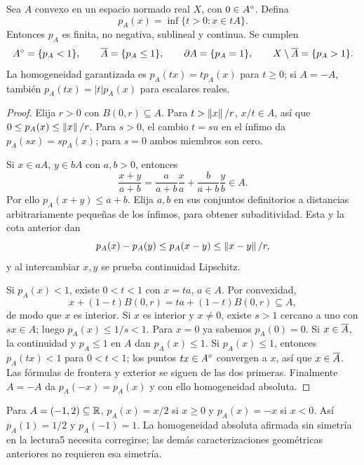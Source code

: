 \begin{teorema}\label{v3:minkowski}
Sea $A$ convexo en un espacio normado real $X$, con $0\in A^{\circ}$. Defina
\[
 p_A(x)=\inf\{t>0:x\in tA\}.
\]
Entonces $p_A$ es finita, no negativa, sublineal y continua. Se cumplen
\[
 A^{\circ}=\{p_A<1\},\qquad \overline{A}=\{p_A\leq1\},\qquad
 \partial A=\{p_A=1\},\qquad X\setminus\overline{A}=\{p_A>1\}.
\]
La homogeneidad garantizada es $p_A(tx)=tp_A(x)$ para $t\geq0$; si $A=-A$, también $p_A(tx)=|t|p_A(x)$ para escalares reales.
\end{teorema}
\begin{proof}
Elija $r>0$ con $B(0,r)\subseteq A$. Para $t>\left\lVert x\right\rVert/r$, $x/t\in A$, así que $0\leq p_A(x)\leq\left\lVert x\right\rVert/r$. Para $s>0$, el cambio $t=su$ en el ínfimo da $p_A(sx)=sp_A(x)$; para $s=0$ ambos miembros son cero.

Si $x\in aA$, $y\in bA$ con $a,b>0$, entonces
\[
 \frac{x+y}{a+b}=\frac a{a+b}\frac xa+\frac b{a+b}\frac yb\in A.
\]
Por ello $p_A(x+y)\leq a+b$. Elija $a,b$ en sus conjuntos definitorios a distancias arbitrariamente pequeñas de los ínfimos, para obtener subaditividad. Esta y la cota anterior dan
\[
 p_A(x)-p_A(y)\leq p_A(x-y)\leq\left\lVert x-y\right\rVert/r,
\]
y al intercambiar $x,y$ se prueba continuidad Lipschitz.

Si $p_A(x)<1$, existe $0<t<1$ con $x=ta$, $a\in A$. Por convexidad,
\[
 x+(1-t)B(0,r)=ta+(1-t)B(0,r)\subseteq A,
\]
de modo que $x$ es interior. Si $x$ es interior y $x\ne0$, existe $s>1$ cercano a uno con $sx\in A$; luego $p_A(x)\leq1/s<1$. Para $x=0$ ya sabemos $p_A(0)=0$. Si $x\in\overline{A}$, la continuidad y $p_A\leq1$ en $A$ dan $p_A(x)\leq1$. Si $p_A(x)\leq1$, entonces $p_A(tx)<1$ para $0<t<1$; los puntos $tx\in A^{\circ}$ convergen a $x$, así que $x\in\overline{A}$. Las fórmulas de frontera y exterior se siguen de las dos primeras. Finalmente $A=-A$ da $p_A(-x)=p_A(x)$ y con ello homogeneidad absoluta.
\end{proof}
\begin{observacion}
Para $A=(-1,2)\subseteq\mathbb R$, $p_A(x)=x/2$ si $x\geq0$ y $p_A(x)=-x$ si $x<0$. Así $p_A(1)=1/2$ y $p_A(-1)=1$. La homogeneidad absoluta afirmada sin simetría en la lectura5 necesita corregirse; las demás caracterizaciones geométricas anteriores no requieren esa simetría.
\end{observacion}

